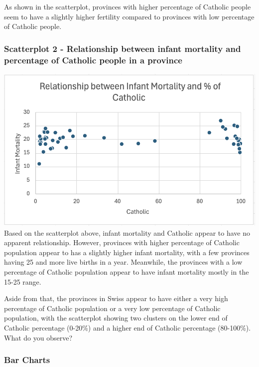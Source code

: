\documentclass[
  letterpaper,
  DIV=11,
  numbers=noendperiod]{scrreprt}
\begin{document}
As shown in the scatterplot, provinces with higher percentage of
Catholic people seem to have a slightly higher fertility compared to
provinces with low percentage of Catholic people.

\subsubsection{Scatterplot 2 - Relationship between infant mortality and
percentage of Catholic people in a
province}\label{scatterplot-2---relationship-between-infant-mortality-and-percentage-of-catholic-people-in-a-province}

\includegraphics{./Excel_1_Unit/Week1_Janice/Week 1/Week 1 Wednesday/Swiss_scatterplot2.png}
Based on the scatterplot above, infant mortality and Catholic appear to
have no apparent relationship. However, provinces with higher percentage
of Catholic population appear to has a slightly higher infant mortality,
with a few provinces having 25 and more live births in a year.
Meanwhile, the provinces with a low percentage of Catholic population
appear to have infant mortality mostly in the 15-25 range.

Aside from that, the provinces in Swiss appear to have either a very
high percentage of Catholic population or a very low percentage of
Catholic population, with the scatterplot showing two clusters on the
lower end of Catholic percentage (0-20\%) and a higher end of Catholic
percentage (80-100\%). What do you observe?

\subsubsection{Bar Charts}\label{bar-charts}
\end{document}
